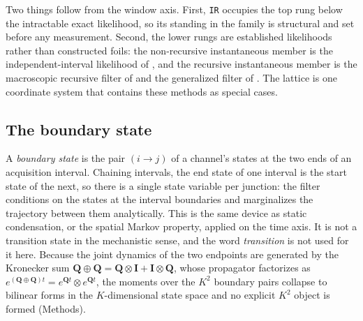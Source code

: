 Two things follow from the window axis. First, \texttt{IR} occupies the top rung below the
intractable exact likelihood, so its standing in the family is structural and set before
any measurement. Second, the lower rungs are established likelihoods rather than
constructed foils: the non-recursive instantaneous member is the independent-interval
likelihood of \citet{milescu2005maximum}, and the recursive instantaneous member is the
macroscopic recursive filter of \citet{moffatt2007estimation} and the generalized filter
of \citet{munch2022bayesian}. The lattice is one coordinate system that contains these
methods as special cases.

\subsection*{The boundary state}

A \emph{boundary state} is the pair $(i\to j)$ of a channel's states at the two ends of
an acquisition interval. Chaining intervals, the end state of one interval is the start
state of the next, so there is a single state variable per junction: the filter conditions
on the states at the interval boundaries and marginalizes the trajectory between them
analytically. This is the same device as static condensation, or the spatial Markov
property, applied on the time axis. It is not a transition state in the mechanistic sense,
and the word \emph{transition} is not used for it here. Because the joint dynamics of the two
endpoints are generated by the Kronecker sum
$\mathbf{Q}\oplus\mathbf{Q}=\mathbf{Q}\otimes\mathbf{I}+\mathbf{I}\otimes\mathbf{Q}$, whose
propagator factorizes as $e^{(\mathbf{Q}\oplus\mathbf{Q})t}=e^{\mathbf{Q}t}\otimes
e^{\mathbf{Q}t}$, the moments over the $K^2$ boundary pairs collapse to bilinear forms in
the $K$-dimensional state space and no explicit $K^2$ object is formed (Methods).

